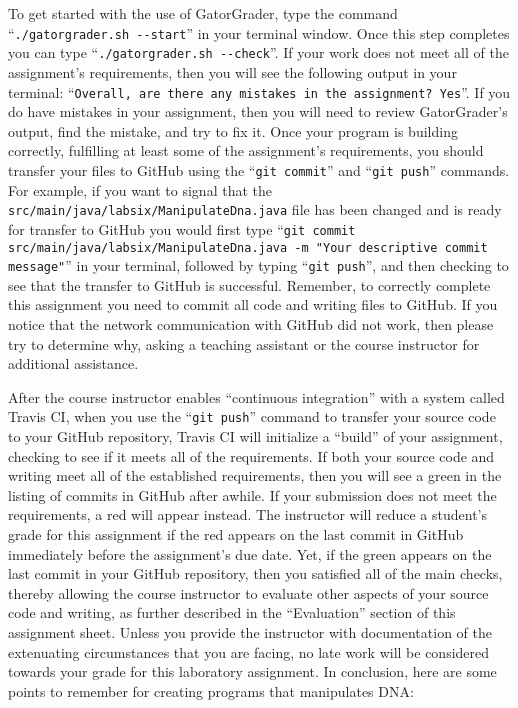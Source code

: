 \documentclass[11pt]{article}
\newcommand{\mainprogramsource}{\lstinline{src/main/java/labsix/ManipulateDna.java}}
\newcommand{\gatorgraderstart}{\command{./gatorgrader.sh --start}}
\newcommand{\gatorgradercheck}{\command{./gatorgrader.sh --check}}
\newcommand{\gitcommit}{\command{git commit}}
\newcommand{\gitpush}{\command{git push}}
\newcommand{\gitcommitmainprogram}{\command{git commit src/main/java/labsix/ManipulateDna.java -m "Your
descriptive commit message"}}
\newcommand{\command}[1]{``\lstinline{#1}''}
\newcommand{\step}[1]{``{#1}''}
\newcommand{\checkmark}{\ding{51}}
\newcommand{\naughtmark}{\ding{55}}
\begin{document}
To get started with the use of GatorGrader, type the command \gatorgraderstart{} in your terminal window. Once this step
completes you can type \gatorgradercheck{}. If your work does not meet all of the assignment's requirements, then you
will see the following output in your terminal: \command{Overall, are there any mistakes in the assignment? Yes}. If you
do have mistakes in your assignment, then you will need to review GatorGrader's output, find the mistake, and try to fix
it. Once your program is building correctly, fulfilling at least some of the assignment's requirements, you should
transfer your files to GitHub using the \gitcommit{} and \gitpush{} commands. For example, if you want to signal that
the \mainprogramsource{} file has been changed and is ready for transfer to GitHub you would first type
\gitcommitmainprogram{} in your terminal, followed by typing \gitpush{}, and then checking to see that the transfer to
GitHub is successful. Remember, to correctly complete this assignment you need to commit all code and writing files to
GitHub. If you notice that the network communication with GitHub did not work, then please try to determine why, asking
a teaching assistant or the course instructor for additional assistance.

After the course instructor enables \step{continuous integration} with a system called Travis CI, when you use the
\gitpush{} command to transfer your source code to your GitHub repository, Travis CI will initialize a \step{build} of
your assignment, checking to see if it meets all of the requirements. If both your source code and writing meet all of
the established requirements, then you will see a green \checkmark{} in the listing of commits in GitHub after awhile.
If your submission does not meet the requirements, a red \naughtmark{} will appear instead. The instructor will reduce a
student's grade for this assignment if the red \naughtmark{} appears on the last commit in GitHub immediately before the
assignment's due date. Yet, if the green \checkmark{} appears on the last commit in your GitHub repository, then you
satisfied all of the main checks, thereby allowing the course instructor to evaluate other aspects of your source code
and writing, as further described in the \step{Evaluation} section of this assignment sheet. Unless you provide the
instructor with documentation of the extenuating circumstances that you are facing, no late work will be considered
towards your grade for this laboratory assignment. In conclusion, here are some points to remember for creating programs
that manipulates DNA:
\end{document}
